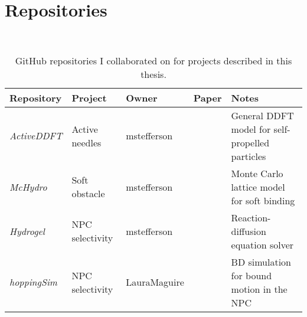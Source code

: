 \chapter{Repositories}~\label{appx:repos}

\begin{table}[htbp]
  \begin{center}
    \begin{tabular}{p{2.75cm}p{4.0cm}p{3.0cm}p{1.0cm}p{3.0cm}}
      Repository & Project & Owner & Paper & Notes \\
      \toprule
      \textit{ActiveDDFT} & Active needles & mstefferson
      &~\cite{stefferson_selforganized_18} &
      General DDFT model for
      self-propelled particles\\
      \textit{McHydro} & Soft obstacle & mstefferson 
      &~\cite{stefferson_effects_17} & 
      Monte Carlo lattice model for soft binding\\
      \textit{Hydrogel} & NPC selectivity & mstefferson 
      &~\cite{maguire_design_18} &
      Reaction-diffusion equation solver\\
      \textit{hoppingSim} & NPC selectivity & LauraMaguire
      &~\cite{maguire_design_18} &
      BD simulation for bound motion in the NPC
    \end{tabular}
  \end{center}
  \caption[GitHub repositories]
  {GitHub repositories I collaborated on for projects described in this 
    thesis.}\label{table:repos}
\end{table}

